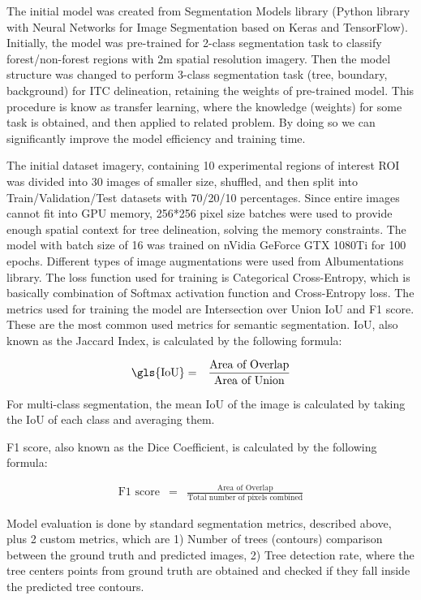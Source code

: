 The initial model was created from Segmentation Models library (Python library with Neural Networks for Image Segmentation based on Keras and TensorFlow). Initially, the model was pre-trained for 2-class segmentation task to classify forest/non-forest regions with 2m spatial resolution imagery. Then the model structure was changed to perform 3-class segmentation task (tree, boundary, background) for \gls{ITC} delineation, retaining the weights of pre-trained model. This procedure is know as transfer learning, where the knowledge (weights) for some task is obtained, and then applied to related problem. By doing so we can significantly improve the model efficiency and training time. 

The initial dataset imagery, containing 10 experimental regions of interest \gls{ROI} was divided into 30 images of smaller size, shuffled, and then split into Train/Validation/Test datasets with 70/20/10 percentages. Since entire images cannot fit into GPU memory, 256*256 pixel size batches were used to provide enough spatial context for tree delineation, solving the memory constraints. The model with batch size of 16  was trained on nVidia GeForce GTX 1080Ti for 100 epochs. Different types of image augmentations were used from Albumentations library. The loss function used for training is Categorical Cross-Entropy, which is basically combination of Softmax activation function and Cross-Entropy loss. The metrics used for training the model are Intersection over Union \gls{IoU} and F1 score.
These are the most common used metrics for semantic segmentation. \gls{IoU}, also known as the Jaccard Index, is calculated by the following formula:

\begin{eqnarray*}
\text{\gls{IoU}} & = & \frac{\text{Area of Overlap}}{\text{Area of Union}}
\end{eqnarray*}

For multi-class segmentation, the mean IoU of the image is calculated by taking the IoU of each class and averaging them. 

F1 score, also known as the Dice Coefficient, is calculated by the following formula:

\begin{eqnarray*}
\text{F1 score} & = & \frac{\text{Area of Overlap}}{\text{Total number of pixels combined}}
\end{eqnarray*}


Model evaluation is done by standard segmentation metrics, described above, plus 2 custom metrics, which are 1) Number of trees (contours) comparison between the ground truth and predicted images, 2) Tree detection rate, where the tree centers points from ground truth are obtained and checked if they fall inside the predicted tree contours.



